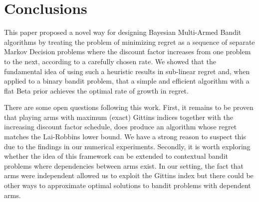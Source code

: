 \section{Conclusions} \label{sec:conclusions}
This paper proposed a novel way for designing Bayesian Multi-Armed Bandit algorithms by treating the problem of minimizing regret as a sequence of separate Markov Decision problems where the discount factor increases from one problem to the next, according to a carefully chosen rate. We  showed that the fundamental idea of using such a heuristic results in sub-linear regret and, when applied to a binary bandit problem, that a simple and efficient algorithm with a flat Beta prior achieves the optimal rate of growth in regret.

There are some open questions following this work. First, it remains to be proven that playing arms with maximum (exact) Gittins indices together with the increasing discount factor schedule, does produce an algorithm whose regret matches the Lai-Robbins lower bound. We have a strong reason to suspect this due to the findings in our numerical experiments. Secondly, it is worth exploring whether the idea of this framework can be extended to contextual bandit problems where dependencies between arms exist. In our setting, the fact that arms were independent allowed us to exploit the Gittins index but there could be other ways to approximate optimal solutions to bandit problems with dependent arms.